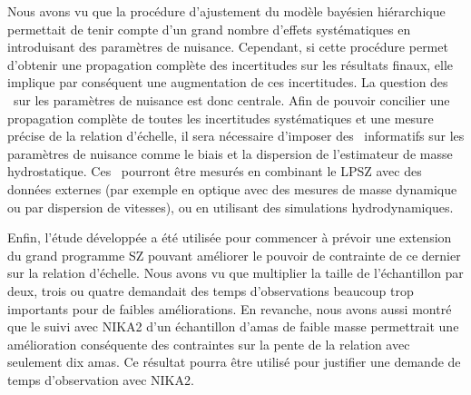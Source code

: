 Nous avons vu que la procédure d'ajustement du modèle bayésien hiérarchique permettait de tenir compte d'un grand nombre d'effets systématiques en introduisant des paramètres de nuisance.
Cependant, si cette procédure permet d'obtenir une propagation complète des incertitudes sur les résultats finaux, elle implique par conséquent une augmentation de ces incertitudes.
La question des \prior\ sur les paramètres de nuisance est donc centrale.
Afin de pouvoir concilier une propagation complète de toutes les incertitudes systématiques et une mesure précise de la relation d'échelle, il sera nécessaire d'imposer des \prior\ informatifs sur les paramètres de nuisance comme le biais et la dispersion de l'estimateur de masse hydrostatique.
Ces \prior\ pourront être mesurés en combinant le LPSZ avec des données externes (par exemple en optique avec des mesures de masse dynamique ou par dispersion de vitesses), ou en utilisant des simulations hydrodynamiques.

Enfin, l'étude développée a été utilisée pour commencer à prévoir une extension du grand programme SZ pouvant améliorer le pouvoir de contrainte de ce dernier sur la relation d'échelle.
Nous avons vu que multiplier la taille de l'échantillon par deux, trois ou quatre demandait des temps d'observations beaucoup trop importants pour de faibles améliorations.
En revanche, nous avons aussi montré que le suivi avec NIKA2 d'un échantillon d'amas de faible masse permettrait une amélioration conséquente des contraintes sur la pente de la relation avec seulement dix amas.
Ce résultat pourra être utilisé pour justifier une demande de temps d'observation avec NIKA2.
